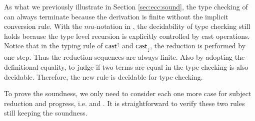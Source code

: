 As what we previously illustrate in Section \ref{sec:ecc:sound}, the type checking of \expcc can always terminate because the derivation is finite without the implicit conversion rule. With the $mu$-notation in \name, the decidability of type checking still holds because the type level recursion is explicitly controlled by cast operations. Notice that in the typing rule of $ \mathsf{cast}^{\uparrow} $ and $ \mathsf{cast}_{\downarrow} $, the reduction is performed by one step. Thus the reduction sequences are always finite. Also by adopting the definitional equality, to judge if two terms are equal in the type checking is also decidable. Therefore, the new  rule is decidable for type checking.

To prove the soundness, we only need to consider each one more case for subject reduction and progress, i.e.  and . It is straightforward to verify these two rules still keeping the soundness.
